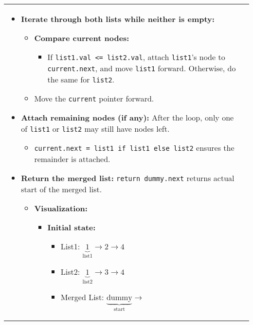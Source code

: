 \begin{summary}
\begin{center}
\begin{tabular}{ll}
{\begin{itemize}
                        \item \textbf{Iterate through both lists while neither is empty:} 
                        \begin{itemize}
                            \item \textbf{Compare current nodes:}
                            \begin{itemize}
                                \item If \texttt{list1.val <= list2.val}, attach \texttt{list1}'s node to \texttt{current.next}, and move \texttt{list1} forward. Otherwise, do the same for \texttt{list2}.
                            \end{itemize}
                            \item Move the \texttt{current} pointer forward.
                        \end{itemize}
                    
                        \item \textbf{Attach remaining nodes (if any):} After the loop, only one of \texttt{list1} or \texttt{list2} may still have nodes left. 
                        \begin{itemize}
                            \item \texttt{current.next = list1 if list1 else list2} ensures the remainder is attached.
                        \end{itemize}
                    
                        \item \textbf{Return the merged list:} \texttt{return dummy.next} returns actual start of the merged list.
                        \begin{itemize}
                        \item \textbf{Visualization:}
                        \begin{itemize}
                            \item \textbf{Initial state:}
                            
                            \begin{itemize}
                                \item List1: $\underbrace{1}_{\text{list1}} \rightarrow 2 \rightarrow 4$
                                \item List2: $\underbrace{1}_{\text{list2}} \rightarrow 3 \rightarrow 4$
                                \item Merged List: $\underbrace{\text{dummy}}_{\text{start}} \rightarrow$
                            \end{itemize}
                        

\end{itemize}
\end{itemize}
\end{itemize}}
\end{tabular}
\end{center}
\end{summary}
